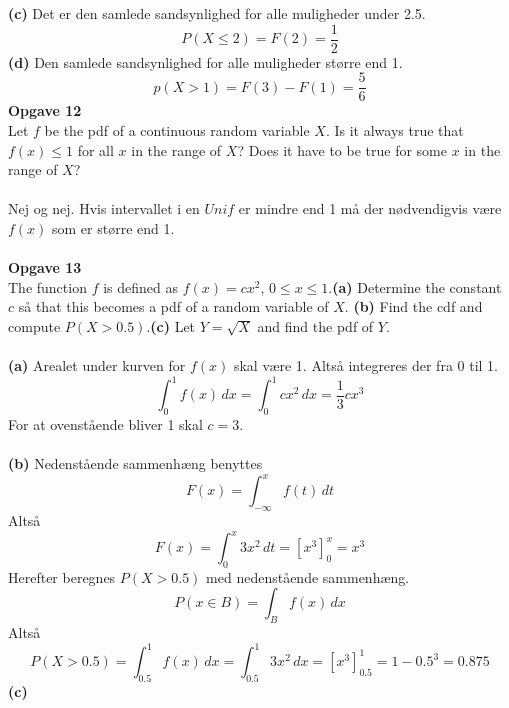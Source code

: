\documentclass[12pt,a4paper,draft]{report}
\begin{document}
\textbf{(c)} Det er den samlede sandsynlighed for alle muligheder under 2.5.
\begin{equation}
P(X\leq 2)=F(2)=\frac{1}{2}
\end{equation}
\textbf{(d)} Den samlede sandsynlighed for alle muligheder større end 1.
\begin{equation}
p(X>1)=F(3)-F(1)=\frac{5}{6}
\end{equation}
\textbf{Opgave 12}\\
Let $f$ be the pdf of a continuous random variable $X$. Is it always true that $f(x)\leq 1$ for all $x$ in the range of $X$? Does it have to be true  for some $x$ in the range of $X$?\\\\
Nej og nej. Hvis intervallet i en $Unif$ er mindre end 1 må der nødvendigvis være $f(x)$ som er større end 1.\\\\
\textbf{Opgave 13}\\
The function $f$ is defined as $f(x)=cx^2$, $0\leq x\leq 1$.\textbf{(a)} Determine the constant $c$ så that this becomes a pdf of a random variable of $X$. \textbf{(b)} Find the cdf and compute $P(X>0.5)$.\textbf{(c)} Let $Y=\sqrt{X}$ and find the pdf  of $Y$.\\\\
\textbf{(a)} Arealet under kurven for $f(x)$ skal være 1. Altså integreres der fra 0 til 1.
\begin{equation}
\int_0^1\!f(x)\,dx=\int_0^1\!cx^2\,dx=\frac{1}{3}cx^3
\end{equation}
For at ovenstående bliver 1 skal $c=3$.\\\\
\textbf{(b)} Nedenstående sammenhæng benyttes
\begin{equation}
F(x)=\int_{-\infty}^x\!f(t)\,dt
\end{equation}
Altså
\begin{equation}
F(x)=\int_{0}^x3x^2\,dt=[x^3]_0^x=x^3
\end{equation}
Herefter beregnes $P(X>0.5)$ med nedenstående sammenhæng.
\begin{equation}
P(x\in B)=\int_B\!f(x)\,dx
\end{equation}
Altså
\begin{equation}
P(X>0.5)=\int_{0.5}^{1}\!f(x)\,dx=\int_{0.5}^{1}\!3x^2\,dx=[x^3]_{0.5}^1=1-0.5^3=0.875
\end{equation}
\textbf{(c)}
\end{document}
